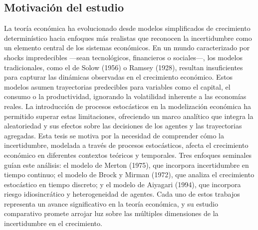 \documentclass[a4paper,12pt]{article}
\begin{document}
	\subsection{Motivación del estudio}
	La teoría económica ha evolucionado desde modelos simplificados de crecimiento determinístico hacia enfoques más realistas que reconocen la incertidumbre como un elemento central de los sistemas económicos. En un mundo caracterizado por shocks impredecibles —sean tecnológicos, financieros o sociales—, los modelos tradicionales, como el de Solow (1956) o Ramsey (1928), resultan insuficientes para capturar las dinámicas observadas en el crecimiento económico. Estos modelos asumen trayectorias predecibles para variables como el capital, el consumo o la productividad, ignorando la volatilidad inherente a las economías reales. La introducción de procesos estocásticos en la modelización económica ha permitido superar estas limitaciones, ofreciendo un marco analítico que integra la aleatoriedad y sus efectos sobre las decisiones de los agentes y las trayectorias agregadas.
	Esta tesis se motiva por la necesidad de comprender cómo la incertidumbre, modelada a través de procesos estocásticos, afecta el crecimiento económico en diferentes contextos teóricos y temporales. Tres enfoques seminales guían este análisis: el modelo de Merton (1975), que incorpora incertidumbre en tiempo continuo; el modelo de Brock y Mirman (1972), que analiza el crecimiento estocástico en tiempo discreto; y el modelo de Aiyagari (1994), que incorpora riesgo idiosincrático y heterogeneidad de agentes. Cada uno de estos trabajos representa un avance significativo en la teoría económica, y su estudio comparativo promete arrojar luz sobre las múltiples dimensiones de la incertidumbre en el crecimiento.
	
\end{document}
